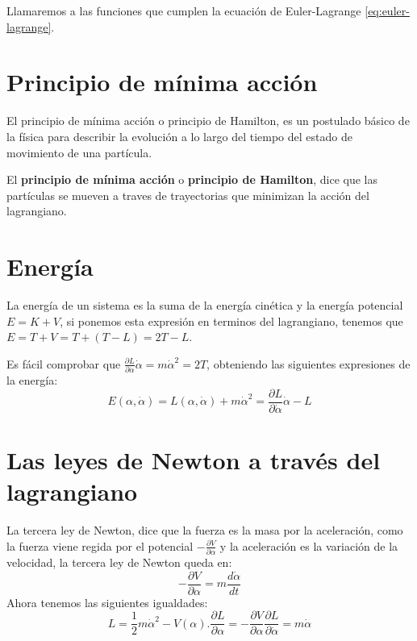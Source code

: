\begin{definition}
    Llamaremos  a las funciones que cumplen la ecuación de Euler-Lagrange \eqref{eq:euler-lagrange}.
\end{definition}


\section{Principio de mínima acción}

El principio de mínima acción o principio de Hamilton, es un postulado básico de la física para describir la evolución a lo largo del tiempo del estado de movimiento de una partícula.

El \textbf{principio de mínima acción} o \textbf{principio de Hamilton}, dice que las partículas se mueven a traves de trayectorias que minimizan la acción del lagrangiano.


\section{Energía}
La energía de un sistema es la suma de la energía cinética y la energía potencial $E=K+V$, si ponemos esta expresión en terminos del lagrangiano, tenemos que $E=T+V=T+(T-L)=2T-L$.

Es fácil comprobar que $\frac{\partial L}{\partial\dot{\alpha}}\dot{\alpha}=m\dot{\alpha}^2=2T$, obteniendo las siguientes expresiones de la energía:
\begin{equation}
    \label{eq:energia_lagrangiana}
    E(\alpha, \dot{\alpha})=L(\alpha, \dot{\alpha})+m\dot{\alpha}^2=\frac{\partial L}{\partial\dot{\alpha}}\dot{\alpha}-L
\end{equation}


\section{Las leyes de Newton a través del lagrangiano}
La tercera ley de Newton, dice que la fuerza es la masa por la aceleración, como la fuerza viene regida por el potencial $-\frac{\partial V}{\partial\alpha}$ y la aceleración es la variación de la velocidad, la tercera ley de Newton queda en:
\begin{equation*}
    -\frac{\partial V}{\partial\alpha} = m\frac{d\dot{\alpha}}{dt}
\end{equation*}
Ahora tenemos las siguientes igualdades:
\begin{subequations}
    \begin{equation*}
        L=\frac{1}{2}m\dot{\alpha}^2-V(\alpha).
    \end{equation*}
    \begin{equation*}
        \frac{\partial L}{\partial \alpha}=-\frac{\partial V}{\partial \alpha}
    \end{equation*}
    \begin{equation*}
        \frac{\partial L}{\partial\dot{\alpha}}=m\dot{\alpha}
    \end{equation*}
\end{subequations}


